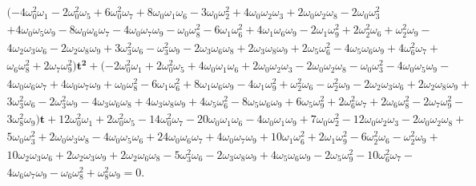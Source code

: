 \documentclass[a4paper,10pt]{amsart}
\theoremstyle{plain}
\theoremstyle{definition}
\theoremstyle{remark}
\numberwithin{equation}{section}
\begin{document}
    \begin{gather*}
(-4\omega_{0}^2\omega_{1} - 2\omega_{0}^2\omega_{5} + 6\omega_{0}^2\omega_{7} + 8\omega_{0}\omega_{1}\omega_{6} - 3\omega_{0}\omega_{2}^2
    + 4\omega_{0}\omega_{2}\omega_{3} + 2\omega_{0}\omega_{2}\omega_{8} - 2\omega_{0}\omega_{3}^2 \\+ 4\omega_{0}\omega_{5}\omega_{9} -
    8\omega_{0}\omega_{6}\omega_{7} - 
4\omega_{0}\omega_{7}\omega_{9} - \omega_{0}\omega_{8}^2 - 6\omega_{1}\omega_{6}^2 +
    4\omega_{1}\omega_{6}\omega_{9} - 2\omega_{1}\omega_{9}^2 + 2\omega_{2}^2\omega_{6} + \omega_{2}^2\omega_{9} -\\
    4\omega_{2}\omega_{3}\omega_{6} - 2\omega_{2}\omega_{8}\omega_{9} + 3\omega_{3}^2\omega_{6} - \omega_{3}^2\omega_{9} -
    2\omega_{3}\omega_{6}\omega_{8} + 2\omega_{3}\omega_{8}\omega_{9} + 2\omega_{5}\omega_{6}^2 - 4\omega_{5}\omega_{6}\omega_{9} +
    4\omega_{6}^2\omega_{7} +\\ \omega_{6}\omega_{8}^2 + 2\omega_{7}\omega_{9}^2)\pmb{t^2}+( - 2\omega_{0}^2\omega_{1} + 2\omega_{0}^2\omega_{5} +
    4\omega_{0}\omega_{1}\omega_{6} + 
2\omega_{0}\omega_{2}\omega_{3} - 2\omega_{0}\omega_{2}\omega_{8} - \omega_{0}\omega_{3}^2 - 4\omega_{0}\omega_{5}\omega_{9} -\\
    4\omega_{0}\omega_{6}\omega_{7} + 4\omega_{0}\omega_{7}\omega_{9} + \omega_{0}\omega_{8}^2 - 6\omega_{1}\omega_{6}^2 + 8\omega_{1}\omega_{6}\omega_{9} -
    4\omega_{1}\omega_{9}^2 +
 \omega_{2}^2\omega_{6} - \omega_{2}^2\omega_{9} - 2\omega_{2}\omega_{3}\omega_{6} + 2\omega_{2}\omega_{8}\omega_{9} +\\
    3\omega_{3}^2\omega_{6} - 2\omega_{3}^2\omega_{9} - 4\omega_{3}\omega_{6}\omega_{8} + 4\omega_{3}\omega_{8}\omega_{9} + 4\omega_{5}\omega_{6}^2 -
    8\omega_{5}\omega_{6}\omega_{9} + 6\omega_{5}\omega_{9}^2 +
 2\omega_{6}^2\omega_{7} + 2\omega_{6}\omega_{8}^2 - 2\omega_{7}\omega_{9}^2 -\\
    3\omega_{8}^2\omega_{9} )\pmb{t}+ 12\omega_{0}^2\omega_{1} + 2\omega_{0}^2\omega_{5} - 14\omega_{0}^2\omega_{7} - 20\omega_{0}\omega_{1}\omega_{6} - 4\omega_{0}\omega_{1}\omega_{9}
    + 7\omega_{0}\omega_{2}^2 - 
12\omega_{0}\omega_{2}\omega_{3} - 2\omega_{0}\omega_{2}\omega_{8} +\\ 5\omega_{0}\omega_{3}^2 + 2\omega_{0}\omega_{3}\omega_{8} - 4\omega_{0}\omega_{5}\omega_{6}
    +  24\omega_{0}\omega_{6}\omega_{7} + 4\omega_{0}\omega_{7}\omega_{9} + 10\omega_{1}\omega_{6}^2 + 2\omega_{1}\omega_{9}^2 -
 6\omega_{2}^2\omega_{6} - \omega_{2}^2\omega_{9} +\\
    10\omega_{2}\omega_{3}\omega_{6} + 2\omega_{2}\omega_{3}\omega_{9} + 2\omega_{2}\omega_{6}\omega_{8} - 5\omega_{3}^2\omega_{6} - 2\omega_{3}\omega_{8}\omega_{9} + 4\omega_{5}\omega_{6}\omega_{9}
    - 2\omega_{5}\omega_{9}^2 - 10\omega_{6}^2\omega_{7} - \\
4\omega_{6}\omega_{7}\omega_{9} - \omega_{6}\omega_{8}^2 + \omega_{8}^2\omega_{9}=0.
\end{gather*}
\end{document}
